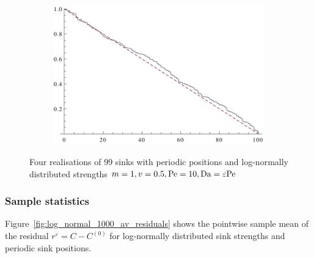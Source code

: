\begin{figure}[ht!]
\begin{subfigure}[b]{0.45\textwidth}
    \end{subfigure}
    \begin{subfigure}[b]{0.45\textwidth}
        \centering
        \includegraphics[scale=0.5]{continuum/figures/strength_lognormal_dist/4}
    \end{subfigure}
    \caption{\label{fig:99_sink_periodic_pos}Four realisations of 99 sinks with
    periodic positions and log-normally distributed strengths \({m=1}, {v=0.5},
    {\mathrm{Pe}=10}, {\mathrm{Da}=\varepsilon\mathrm{Pe}}\)}
\end{figure}

\FloatBarrier

\subsubsection{Sample statistics}

Figure~\ref{fig:log_normal_1000_av_residuals} shows the pointwise sample mean of
the residual \(r^\varepsilon = C - C^{(0)}\) for log-normally distributed sink
strengths and periodic sink positions.



